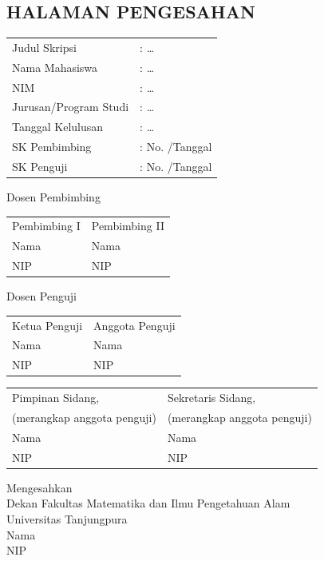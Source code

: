 \begin{singlespace}
\chapter*{HALAMAN PENGESAHAN}
\thispagestyle{empty}
\noindent
\begin{tabular}{@{}ll}
Judul Skripsi & : \dots \\
Nama Mahasiswa & : \dots \\
NIM & : \dots \\
Jurusan/Program Studi & : \dots \\
Tanggal Kelulusan & : \dots \\
SK Pembimbing & : No. \hspace{3cm} /Tanggal \\
SK Penguji & : No. \hspace{3cm} /Tanggal \\
\end{tabular}\par
\vspace{0.5cm}
{\centering Dosen Pembimbing \par}
\noindent
\begin{tabular}{@{}p{}p{}@{}}
\centering Pembimbing I & \centering Pembimbing II \tabularnewline[1.5cm]
\centering Nama & \centering Nama \tabularnewline
\centering NIP & \centering NIP \tabularnewline
\end{tabular}

\vspace{0.5cm}
{\centering Dosen Penguji \par}
\noindent
\begin{tabular}{@{}p{}p{}@{}}
\centering Ketua Penguji & \centering Anggota Penguji \tabularnewline[1.5cm]
\centering Nama & \centering Nama \tabularnewline
\centering NIP & \centering NIP \tabularnewline
\end{tabular}

\vspace{0.5cm}
\noindent
\begin{tabular}{@{}p{}p{}@{}}
\centering Pimpinan Sidang, & \centering Sekretaris Sidang, \tabularnewline
\centering (merangkap anggota penguji) & \centering (merangkap anggota penguji) \tabularnewline[1.5cm]
\centering Nama & \centering Nama \tabularnewline
\centering NIP & \centering NIP \tabularnewline
\end{tabular}

\vspace{0.5cm}
{\centering
Mengesahkan \\
Dekan Fakultas Matematika dan Ilmu Pengetahuan Alam \\
Universitas Tanjungpura \\[1.5cm]
Nama \\
NIP \par}
\end{singlespace}
